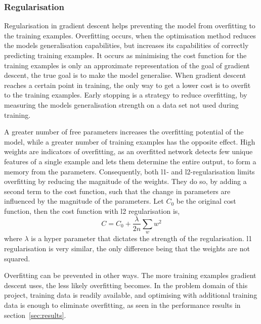 \subsubsection{Regularisation}
\label{sec:regularisation}
Regularisation in gradient descent helps preventing the model from overfitting to the training examples. Overfitting occurs, when the optimisation method reduces the models generalisation capabilities, but increases its capabilities of correctly predicting training examples. It occurs as minimising the cost function for the training examples is only an approximate representation of the goal of gradient descent,  the true goal is to make the model generalise. When gradient descent reaches a certain point in training, the only way to get a lower cost is to overfit to the training examples. Early stopping is a strategy to reduce overfitting, by measuring the models generalisation strength on a data set not used during training.

A greater number of free parameters increases the overfitting potential of the model, while a greater number of training examples has the opposite effect.
High weights are indicators of overfitting, as an overfitted network detects few unique features of a single example and lets them determine the entire output, to form a memory from the parameters. Consequently, both l1- and l2-regularisation limits overfitting by reducing the magnitude of the weights. They do so, by adding a second term to the cost function, such that the change in parameters are influenced by the magnitude of the parameters. Let $C_0$ be the original cost function, then the cost function with l2 regularisation is,
$$C = C_0 + \frac{\lambda}{2n}\sum_{w} w^2 $$
where $\lambda$ is a hyper parameter that dictates the strength of the regularisation. l1 regularisation is very similar, the only difference being that the weights are not squared.

Overfitting can be prevented in other ways. The more training examples gradient descent uses, the less likely overfitting becomes. In the problem domain of this project, training data is readily available, and optimising with additional training data is enough to eliminate overfitting, as seen in the performance results in section~\ref{sec:results}.

